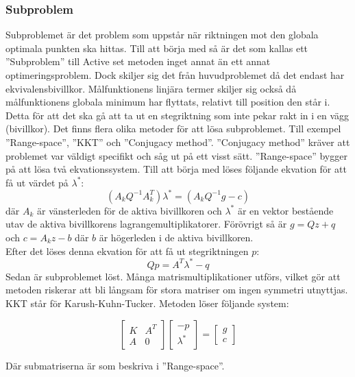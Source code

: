 \subsubsection{Subproblem}
Subproblemet är det problem som uppstår när riktningen mot den globala optimala punkten ska hittas. Till att börja med så är det som kallas ett ''Subproblem'' till Active set metoden inget annat än ett annat optimeringsproblem. Dock skiljer sig det från huvudproblemet då det endast har ekvivalensbivillkor. Målfunktionens linjära termer skiljer sig också då målfunktionens globala minimum har flyttats, relativt till position den står i. Detta för att det ska gå att ta ut en stegriktning som inte pekar rakt in i en vägg (bivillkor). \citep{numericaloptimization}
\newline
\newline
Det finns flera olika metoder för att lösa subproblemet.
Till exempel ''Range-space'', ''KKT'' och ''Conjugacy method''. ''Conjugacy method'' kräver att problemet var väldigt specifikt och såg ut på ett visst sätt. ''Range-space'' bygger på att lösa två ekvationssystem. Till att börja med löses följande ekvation för att få ut värdet på $\lambda^*$:
$$({A_k}Q^{-1}A_k^T)\lambda^* = ({A_k}Q^{-1}g-c)$$
där $A_k$ är vänsterleden för de aktiva bivillkoren och $\lambda^*$ är en vektor bestående utav de aktiva bivillkorens lagrangemultiplikatorer. Förövrigt så är
$g = Qz+q$ och $c = A_kz - b$ där $b$ är högerleden i de aktiva bivillkoren. \\ Efter det löses denna ekvation för att få ut stegriktningen $p$:
$$Qp = A^T\lambda^* - q$$
Sedan är subproblemet löst. Många matrismultiplikationer utförs, vilket gör att metoden riskerar att bli långsam för stora matriser om ingen symmetri utnyttjas. \citep{numericaloptimization}
\newline
\newline
KKT står för Karush-Kuhn-Tucker. Metoden löser följande system:

$$\begin{bmatrix}
K & A^T \\
A & 0
\end{bmatrix}
\begin{bmatrix}
-p \\
\lambda^*
\end{bmatrix}
=
\begin{bmatrix}
g \\
c
\end{bmatrix}
$$

Där submatriserna är som beskriva i ''Range-space''\citep{numericaloptimization}.
